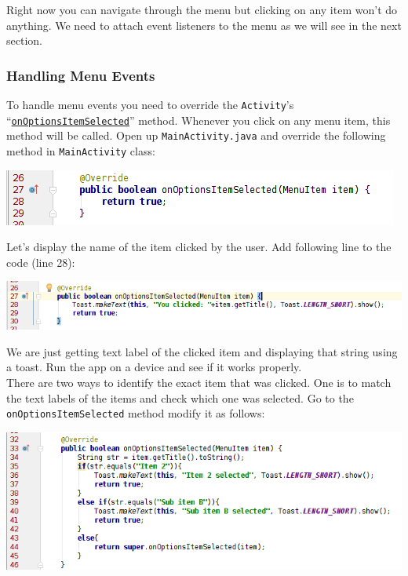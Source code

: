 Right now you can navigate through the menu but clicking on any item won't do anything. We need to attach event listeners to the menu as we will see in the next section.

\subsubsection{Handling Menu Events}
To handle menu events you need to override the \texttt{Activity}'s ``\href{https://developer.android.com/reference/android/app/Activity.html#onOptionsItemSelected(android.view.MenuItem)}{\texttt{onOptionsItemSelected}}'' method. Whenever you click on any menu item, this method will be called. Open up \texttt{MainActivity.java} and override the following method in \texttt{MainActivity} class:

\begin{center}
	\includegraphics[scale=0.4]{chapters/ch07/images/47}
\end{center}

Let's display the name of the item clicked by the user. Add following line to the code (line 28):

\begin{center}
	\includegraphics[scale=0.4]{chapters/ch07/images/48}
\end{center}

We are just getting text label of the clicked item and displaying that string using a toast. Run the app on a device and see if it works properly. \\

There are two ways to identify the exact item that was clicked. One is to match the text labels of the items and check which one was selected. Go to the \texttt{onOptionsItemSelected} method modify it as follows:

\begin{center}
	\includegraphics[scale=0.4]{chapters/ch07/images/49}
\end{center}


